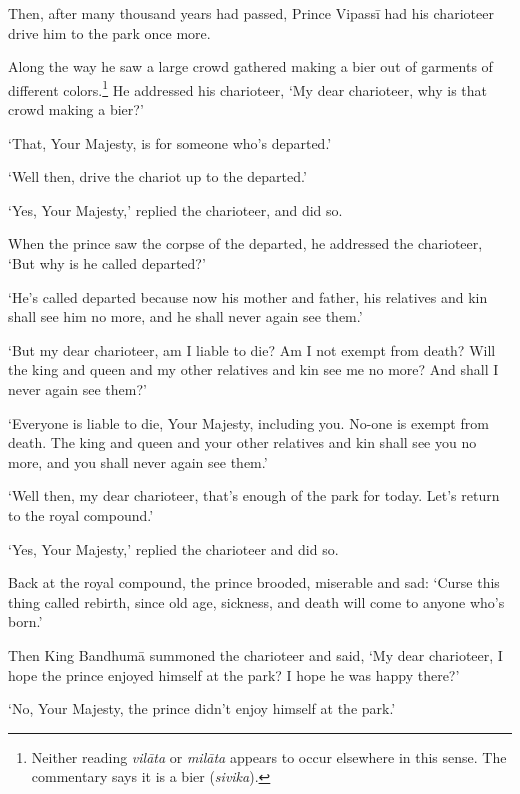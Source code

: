 \documentclass[12pt,openany]{book}%
\begin{document}
Then, after many thousand years had passed, Prince \textsanskrit{Vipassī} had his charioteer drive him to the park once more. 

Along the way he saw a large crowd gathered making a bier out of garments of different colors.\footnote{Neither reading \textit{\textsanskrit{vilāta}} or \textit{\textsanskrit{milāta}} appears to occur elsewhere in this sense. The commentary says it is a bier (\textit{sivika}). } He addressed his charioteer, ‘My dear charioteer, why is that crowd making a bier?’ 

‘That, Your Majesty, is for someone who’s departed.’ 

‘Well then, drive the chariot up to the departed.’ 

‘Yes, Your Majesty,’ replied the charioteer, and did so. 

When the prince saw the corpse of the departed, he addressed the charioteer, ‘But why is he called departed?’ 

‘He’s called departed because now his mother and father, his relatives and kin shall see him no more, and he shall never again see them.’ 

‘But my dear charioteer, am I liable to die? Am I not exempt from death? Will the king and queen and my other relatives and kin see me no more? And shall I never again see them?’ 

‘Everyone is liable to die, Your Majesty, including you. No-one is exempt from death. The king and queen and your other relatives and kin shall see you no more, and you shall never again see them.’ 

‘Well then, my dear charioteer, that’s enough of the park for today. Let’s return to the royal compound.’ 

‘Yes, Your Majesty,’ replied the charioteer and did so. 

Back at the royal compound, the prince brooded, miserable and sad: ‘Curse this thing called rebirth, since old age, sickness, and death will come to anyone who’s born.’ 

Then King \textsanskrit{Bandhumā} summoned the charioteer and said, ‘My dear charioteer, I hope the prince enjoyed himself at the park? I hope he was happy there?’ 

‘No, Your Majesty, the prince didn’t enjoy himself at the park.’ 
\end{document}
